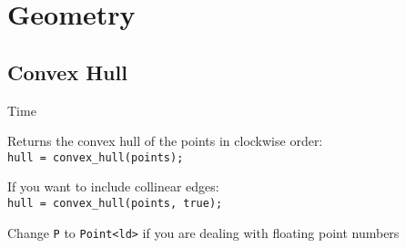\section{Geometry}


\subsection{Convex Hull}
 Time

Returns the convex hull of the points in clockwise order: \\
\verb|hull = convex_hull(points);|

If you want to include collinear edges: \\
\verb|hull = convex_hull(points, true);|

Change \verb|P| to \verb|Point<ld>| if you are dealing with floating point numbers


